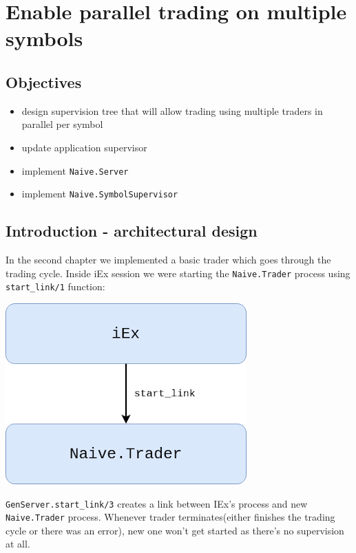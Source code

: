 \documentclass[
  oneside]{book}
\providecommand{\tightlist}{%
  \setlength{\itemsep}{0pt}\setlength{\parskip}{0pt}}
\begin{document}
\hypertarget{enable-parallel-trading-on-multiple-symbols}{%
\chapter{Enable parallel trading on multiple symbols}\label{enable-parallel-trading-on-multiple-symbols}}

\hypertarget{objectives-4}{%
\section{Objectives}\label{objectives-4}}

\begin{itemize}
\tightlist
\item
  design supervision tree that will allow trading using multiple traders in parallel per symbol
\item
  update application supervisor
\item
  implement \texttt{Naive.Server}
\item
  implement \texttt{Naive.SymbolSupervisor}
\end{itemize}

\hypertarget{introduction---architectural-design}{%
\section{Introduction - architectural design}\label{introduction---architectural-design}}

In the second chapter we implemented a basic trader which goes through the trading cycle. Inside iEx session we were starting the \texttt{Naive.Trader} process using \texttt{start\_link/1} function:

\includegraphics{images/chapter_05_01_current_state.png}

\texttt{GenServer.start\_link/3} creates a link between IEx's process and new \texttt{Naive.Trader} process. Whenever trader terminates(either finishes the trading cycle or there was an error), new one won't get started as there's no supervision at all.
\end{document}
